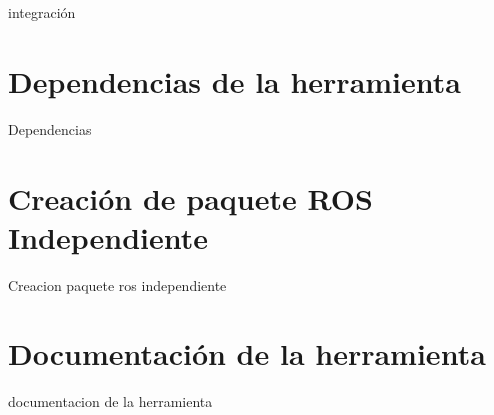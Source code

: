 integración

\section{Dependencias de la herramienta}
\label{sec:dependencias}

Dependencias

\section{Creación de paquete ROS Independiente}
\label{sec:paquete-ros}

Creacion paquete ros independiente

\section{Documentación de la herramienta}
\label{sec:documentacion}

documentacion de la herramienta
